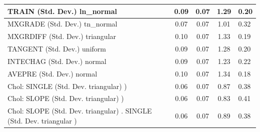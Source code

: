\begin{table}
\begin{center}
\begin{tabular}{|l|l|c|c|c|l|}
			\hline
			TRAIN (Std. Dev.) ln_normal &  & 0.09 & 0.07 & 1.29 & 0.20 \\
			\hline
			MXGRADE (Std. Dev.) tn_normal &  & 0.07 & 0.07 & 1.01 & 0.32 \\
			\hline
			MXGRDIFF (Std. Dev.) triangular &  & 0.10 & 0.07 & 1.33 & 0.19 \\
			\hline
			TANGENT (Std. Dev.) uniform &  & 0.09 & 0.07 & 1.28 & 0.20 \\
			\hline
			INTECHAG (Std. Dev.) normal &  & 0.09 & 0.07 & 1.23 & 0.22 \\
			\hline
			AVEPRE (Std. Dev.) normal &  & 0.10 & 0.07 & 1.34 & 0.18 \\
			\hline
			 Chol: SINGLE (Std. Dev. triangular) ) &  & 0.06 & 0.07 & 0.87 & 0.38 \\
			\hline
			 Chol: SLOPE (Std. Dev. triangular) ) &  & 0.06 & 0.07 & 0.83 & 0.41 \\
			\hline
			 Chol: SLOPE (Std. Dev. triangular) . SINGLE (Std. Dev.   triangular ) &  & 0.06 & 0.07 & 0.89 & 0.38 \\
			\hline
		\end{tabular}
	\end{center}
\end{table}